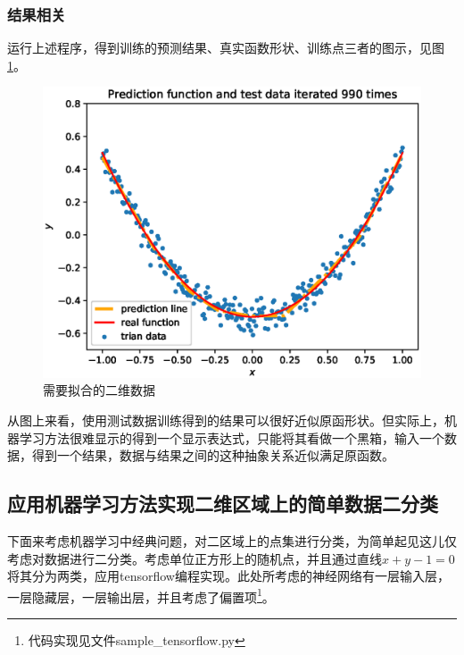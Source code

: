 \documentclass[a4paper,11pt]{ctexart}
\theoremstyle{break}
\theoremstyle{plain}
\begin{document}
\subsubsection{结果相关}
运行上述程序，得到训练的预测结果、真实函数形状、训练点三者的图示，见图\ref{fig:fit_result}。
\begin{figure}[h]
	\centering
	\includegraphics[scale=0.6]{fiting_result.eps}
	\caption{需要拟合的二维数据\label{fig:fit_result}}
\end{figure}
从图上来看，使用测试数据训练得到的结果可以很好近似原函形状。但实际上，机器学习方法很难显示的得到一个显示表达式，只能将其看做一个黑箱，输入一个数据，得到一个结果，数据与结果之间的这种抽象关系近似满足原函数。
\subsection{应用机器学习方法实现二维区域上的简单数据二分类}
下面来考虑机器学习中经典问题，对二区域上的点集进行分类，为简单起见这儿仅考虑对数据进行二分类。考虑单位正方形上的随机点，并且通过直线$x+y-1=0$将其分为两类，应用tensorflow编程实现。此处所考虑的神经网络有一层输入层，一层隐藏层，一层输出层，并且考虑了偏置项\footnote{代码实现见文件sample\_tensorflow.py}。
\end{document}
